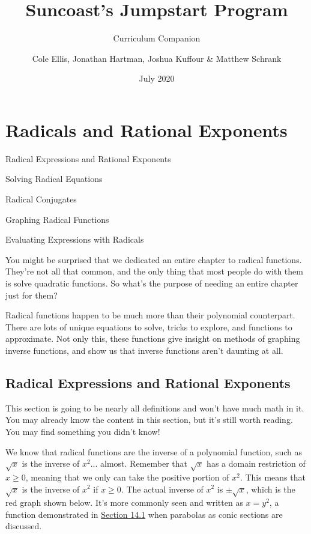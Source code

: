 \documentclass[lang=en,11pt]{elegantbook}
\title{Suncoast's Jumpstart Program}
\subtitle{Curriculum Companion}
\author{Cole Ellis, Jonathan Hartman, Joshua Kuffour \& Matthew Schrank}
\institute{Suncoast High School}
\date{July 2020}
\begin{document}
\maketitle

\frontmatter
\tableofcontents

\mainmatter








\chapter{Radicals and Rational Exponents}
\begin{introduction}[Contents]
\item Radical Expressions and Rational Exponents
\item Solving Radical Equations
\item Radical Conjugates
\item Graphing Radical Functions
\item Evaluating Expressions with Radicals
\end{introduction}
\noindent You might be surprised that we dedicated an entire chapter to radical functions.  They're not all that common, and the only thing that most people do with them is solve quadratic functions.  So what's the purpose of needing an entire chapter just for them?

Radical functions happen to be much more than their polynomial counterpart.  There are lots of unique equations to solve, tricks to explore, and functions to approximate.  Not only this, these functions give insight on methods of graphing inverse functions, and show us that inverse functions aren't daunting at all.
\section{Radical Expressions and Rational Exponents}
\noindent This section is going to be nearly all definitions and won't have much math in it.  You may already know the content in this section, but it's still worth reading. You may find something you didn't know!

We know that radical functions are the inverse of a polynomial function, such as $\sqrt{x}$ is the inverse of $x^2$... almost.  Remember that $\sqrt{x}$ has a domain restriction of $x\geq 0$, meaning that we only can take the positive portion of $x^2$.  This means that $\sqrt{x}$ is the inverse of $x^2$ if $x\geq 0$.  The actual inverse of $x^2$ is $\pm\sqrt{x}$, which is the red graph shown below.  It's more commonly seen and written as $x=y^2$, a function demonstrated in \hyperlink{section.14.1}{Section 14.1} when parabolas as conic sections are discussed.
\end{document}
